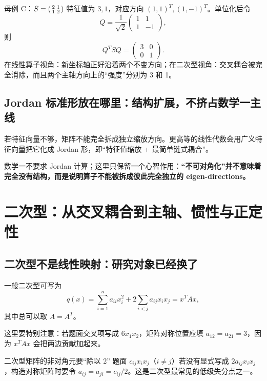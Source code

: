 \documentclass[11pt,a4paper,openany]{ctexbook}
\newcommand{\key}[1]{\textbf{\color{deep}#1}}
\begin{document}
\begin{examplebox}{母例 C：$S=\begin{psmallmatrix}2&1\\1&2\end{psmallmatrix}$}
特征值为 $3,1$，对应方向 $(1,1)^T,(1,-1)^T$。单位化后令
\[
Q=\frac1{\sqrt2}\begin{pmatrix}1&1\\1&-1\end{pmatrix},
\]
则
\[
Q^TSQ=\begin{pmatrix}3&0\\0&1\end{pmatrix}.
\]
在线性算子视角：新坐标轴正好沿着两个不变方向；在二次型视角：交叉耦合被完全消除，而且两个主轴方向上的“强度”分别为 3 和 1。
\end{examplebox}

\section{Jordan 标准形放在哪里：结构扩展，不挤占数学一主线}
若特征向量不够，矩阵不能完全拆成独立缩放方向。更高等的线性代数会用广义特征向量把它化成 Jordan 形，即“特征值缩放 + 最简单链式耦合”。

数学一不要求 Jordan 计算；这里只保留一个心智作用：\key{“不可对角化”并不意味着完全没有结构，而是说明算子不能被拆成彼此完全独立的 eigen-directions。}

\chapter{二次型：从交叉耦合到主轴、惯性与正定性}

\section{二次型不是线性映射：研究对象已经换了}
一般二次型可写为
\[
q(x)=\sum_{i=1}^n a_{ii}x_i^2+2\sum_{i<j}a_{ij}x_ix_j=x^TAx,
\]
其中总可以取 $A=A^T$。

这里要特别注意：若题面交叉项写成 $6x_1x_2$，矩阵对称位置应填 $a_{12}=a_{21}=3$，因为 $x^TAx$ 会把两边贡献加起来。

\begin{boundarybox}{二次型矩阵的非对角元要“除以 2”}
题面 $c_{ij}x_ix_j$（$i\neq j$）若没有显式写成 $2a_{ij}x_ix_j$，构造对称矩阵时要令 $a_{ij}=a_{ji}=c_{ij}/2$。这是二次型最常见的低级失分点之一。
\end{boundarybox}
\end{document}
